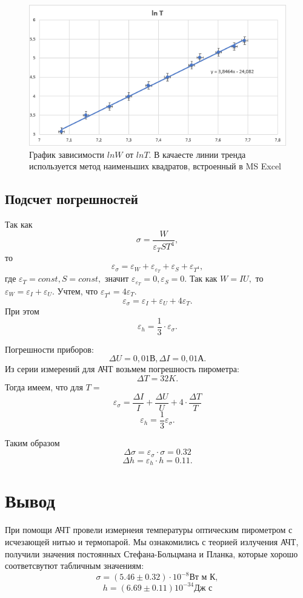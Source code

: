 \documentclass[a4paper,12pt]{article}
\theoremstyle{plain} %
\theoremstyle{definition} %
\theoremstyle{remark} %
\begin{document}
\begin{figure}[H]
        \includegraphics[width=0.89 \textwidth]{Materials/graph.png}
    \caption{График зависимости $ln W$ от $ln T$. В качаесте линии тренда используется метод наименьших квадратов, встроенный в MS Excel }
\end{figure}


\newpage
\subsection{Подсчет погрешностей}

\begin{minipage}{0.4\textwidth}
Так как 
\[\sigma = \dfrac{W}{\varepsilon_T S T^4},\]
то 
\[\varepsilon_\sigma = \varepsilon_W + \varepsilon_{\varepsilon_T} + \varepsilon_S + \varepsilon_{T^4},\]
где $\varepsilon_T = const, S = const,$ значит $\varepsilon_{\varepsilon_T} = 0, \varepsilon_S = 0.$
Так как $W = IU,$ то $\varepsilon_W = \varepsilon_I + \varepsilon_U.$ Учтем, что $\varepsilon_{T^4} = 4\varepsilon_T.$
\[\varepsilon_\sigma = \varepsilon_I + \varepsilon_U + 4\varepsilon_T.\]
При этом 
\[\varepsilon_h = \frac{1}{3}\cdot \varepsilon_\sigma.\]
\end{minipage}
\hfill
\begin{minipage}{0.45\textwidth}

Погрешности приборов:
\[\Delta U = 0,01 \textbf{В}, \Delta I = 0,01 \textbf{А}.\]
Из серии измерений для АЧТ возьмем погрешность пирометра:
\[\Delta T = 32 K.\]
Тогда имеем, что для $T = $
\[\varepsilon_\sigma = \frac{\Delta I}{I} + \frac{\Delta U}{U} + 4\cdot\frac{\Delta T}{T} \]
\[\varepsilon_h = \frac{1}{3}\varepsilon_\sigma .\]
\end{minipage}

Таким образом
\[\Delta \sigma = \varepsilon_\sigma \cdot \sigma = 0.32\]
\[\Delta h = \varepsilon_h \cdot h = 0.11 .\]
\section{Вывод}
При помощи АЧТ провели измернеия температуры оптическим пирометром с исчезающей нитью и термопарой. Мы ознакомились с теорией излучения АЧТ, получили значения постоянных Стефана-Больцмана и Планка, которые хорошо соответсвутют табличным значениям:\\
\[ \sigma = (5.46 \pm 0.32) \cdot 10^{-8} \text{Вт м К}, \] 
\[ h = (6.69 \pm 0.11) 10 ^{-34} \text{Дж с} \]
\end{document}
